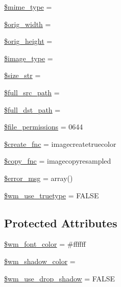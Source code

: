 \begin{DoxyCompactItemize}
\item 
\hyperlink{class_c_i___image__lib_a4d1985caafb49b059e3ca3dedfee257a}{\$mime\+\_\+type} = \textquotesingle{}\textquotesingle{}
\item 
\hyperlink{class_c_i___image__lib_a336a3be3539aaae0ad42aaf4c544bb41}{\$orig\+\_\+width} = \textquotesingle{}\textquotesingle{}
\item 
\hyperlink{class_c_i___image__lib_a68713f45d7d236dfdd6aafdc9668a44d}{\$orig\+\_\+height} = \textquotesingle{}\textquotesingle{}
\item 
\hyperlink{class_c_i___image__lib_a939d6733d998cce893403d2f59f40317}{\$image\+\_\+type} = \textquotesingle{}\textquotesingle{}
\item 
\hyperlink{class_c_i___image__lib_aff68567b98390e0db61065df80af5d49}{\$size\+\_\+str} = \textquotesingle{}\textquotesingle{}
\item 
\hyperlink{class_c_i___image__lib_a7ccf54c8f559eaf70600f69554be39eb}{\$full\+\_\+src\+\_\+path} = \textquotesingle{}\textquotesingle{}
\item 
\hyperlink{class_c_i___image__lib_aa830804dc9d15c51e0672bd4d3602e07}{\$full\+\_\+dst\+\_\+path} = \textquotesingle{}\textquotesingle{}
\item 
\hyperlink{class_c_i___image__lib_abeba5c64fb89ae12956958b88a58f9bf}{\$file\+\_\+permissions} = 0644
\item 
\hyperlink{class_c_i___image__lib_af70f0124d1a34ec7b7360bee16c3a3ea}{\$create\+\_\+fnc} = \textquotesingle{}imagecreatetruecolor\textquotesingle{}
\item 
\hyperlink{class_c_i___image__lib_a4c7eeae509bbd8ac493cafa8a5b9980e}{\$copy\+\_\+fnc} = \textquotesingle{}imagecopyresampled\textquotesingle{}
\item 
\hyperlink{class_c_i___image__lib_acf910733622c1fa671b9f755c69c2ec7}{\$error\+\_\+msg} = array()
\item 
\hyperlink{class_c_i___image__lib_a0415d8aa18349f21751f7a81255918ad}{\$wm\+\_\+use\+\_\+truetype} = F\+A\+L\+S\+E
\end{DoxyCompactItemize}
\subsection*{Protected Attributes}
\begin{DoxyCompactItemize}
\item 
\hyperlink{class_c_i___image__lib_ae9498442637ff2466d4426af45f68c6b}{\$wm\+\_\+font\+\_\+color} = \textquotesingle{}\#ffffff\textquotesingle{}
\item 
\hyperlink{class_c_i___image__lib_aca292b49514fe3238440675c4b2642ca}{\$wm\+\_\+shadow\+\_\+color} = \textquotesingle{}\textquotesingle{}
\item 
\hyperlink{class_c_i___image__lib_a49b77ed476cebe5f357705e7a9c4ccce}{\$wm\+\_\+use\+\_\+drop\+\_\+shadow} = F\+A\+L\+S\+E
\end{DoxyCompactItemize}


